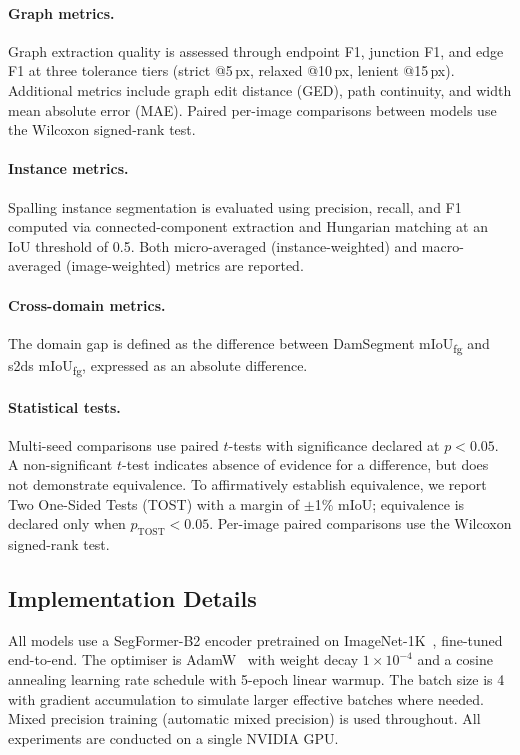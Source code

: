 \documentclass[preprint,12pt]{elsarticle}
\begin{document}
\paragraph{Graph metrics.}
Graph extraction quality is assessed through endpoint F1, junction F1, and edge F1 at three tolerance tiers (strict @5\,px, relaxed @10\,px, lenient @15\,px). Additional metrics include graph edit distance (GED), path continuity, and width mean absolute error (MAE). Paired per-image comparisons between models use the Wilcoxon signed-rank test.

\paragraph{Instance metrics.}
Spalling instance segmentation is evaluated using precision, recall, and F1 computed via connected-component extraction and Hungarian matching at an IoU threshold of 0.5. Both micro-averaged (instance-weighted) and macro-averaged (image-weighted) metrics are reported.

\paragraph{Cross-domain metrics.}
The domain gap is defined as the difference between DamSegment mIoU\textsubscript{fg} and s2ds mIoU\textsubscript{fg}, expressed as an absolute difference.

\paragraph{Statistical tests.}
Multi-seed comparisons use paired $t$-tests with significance declared at $p < 0.05$. A non-significant $t$-test indicates absence of evidence for a difference, but does not demonstrate equivalence. To affirmatively establish equivalence, we report Two One-Sided Tests (TOST) with a margin of $\pm$1\% mIoU; equivalence is declared only when $p_{\text{TOST}} < 0.05$. Per-image paired comparisons use the Wilcoxon signed-rank test.

\subsection{Implementation Details}
\label{sec:implementation}

All models use a SegFormer-B2 encoder pretrained on ImageNet-1K~\cite{deng2009imagenet}, fine-tuned end-to-end. The optimiser is AdamW~\cite{loshchilov2019adamw} with weight decay $1 \times 10^{-4}$ and a cosine annealing learning rate schedule with 5-epoch linear warmup. The batch size is 4 with gradient accumulation to simulate larger effective batches where needed. Mixed precision training (automatic mixed precision) is used throughout. All experiments are conducted on a single NVIDIA GPU.
\end{document}
